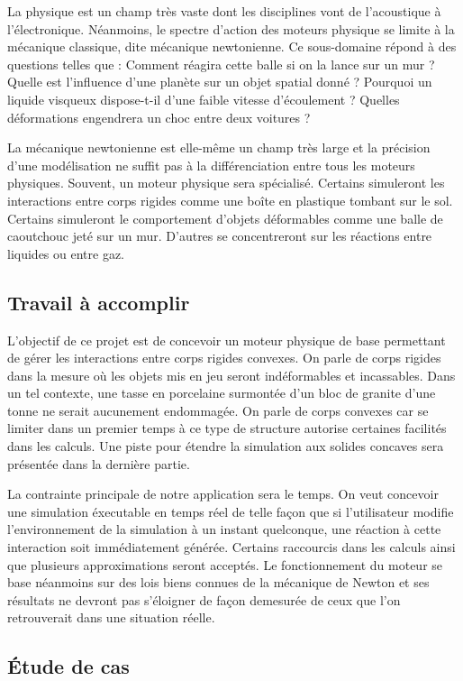 La physique est un champ très vaste dont les disciplines vont de l'acoustique à l'électronique. Néanmoins, le spectre d'action des moteurs physique se limite à la mécanique classique, dite mécanique newtonienne. Ce sous-domaine répond à des questions telles que : Comment réagira cette balle si on la lance sur un mur ? Quelle est l'influence d'une planète sur un objet spatial donné ? Pourquoi un liquide visqueux dispose-t-il d'une faible vitesse d'écoulement ? Quelles déformations engendrera un choc entre deux voitures ?

La mécanique newtonienne est elle-même un champ très large et la précision d'une modélisation ne suffit pas à la différenciation entre tous les moteurs physiques. Souvent, un moteur physique sera spécialisé. Certains simuleront les interactions entre corps rigides comme une boîte en plastique tombant sur le sol. Certains simuleront le comportement d'objets déformables comme une balle de caoutchouc jeté sur un mur. D'autres se concentreront sur les réactions entre liquides ou entre gaz.

\subsection{Travail à accomplir}

L'objectif de ce projet est de concevoir un moteur physique de base permettant de gérer les interactions entre corps rigides convexes. On parle de corps rigides dans la mesure o\`u les objets mis en jeu seront indéformables et incassables. Dans un tel contexte, une tasse en porcelaine surmontée d'un bloc de granite d'une tonne ne serait aucunement endommagée. On parle de corps convexes car se limiter dans un premier temps à ce type de structure autorise certaines facilités dans les calculs. Une piste pour étendre la simulation aux solides concaves sera présentée dans la dernière partie.

La contrainte principale de notre application sera le temps. On veut concevoir une simulation éxecutable en temps réel de telle façon que si l'utilisateur modifie l'environnement de la simulation à un instant quelconque, une réaction à cette interaction soit immédiatement générée. Certains raccourcis dans les calculs ainsi que plusieurs approximations seront acceptés. Le fonctionnement du moteur se base néanmoins sur des lois biens connues de la mécanique de Newton et ses résultats ne devront pas s'éloigner de façon demesurée de ceux que l'on retrouverait dans une situation réelle.

\subsection{\'Etude de cas}

